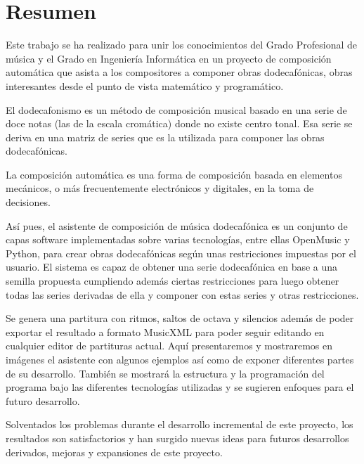 \documentclass[a4paper,openany,oneside,12pt]{book}
\begin{document}
\chapter*{Resumen}

Este trabajo se ha realizado para unir los conocimientos del Grado Profesional de música y el Grado en Ingeniería Informática en un proyecto de composición automática que asista a los compositores a componer obras dodecafónicas, obras interesantes desde el punto de vista matemático y programático.

El dodecafonismo es un método de composición musical basado en una serie de doce notas (las de la escala cromática) donde no existe centro tonal. Esa serie se deriva en una matriz de series que es la utilizada para componer las obras dodecafónicas.

La composición automática es una forma de composición basada en elementos mecánicos, o más frecuentemente electrónicos y digitales, en la toma de decisiones.

Así pues, el asistente de composición de música dodecafónica es un conjunto de capas software implementadas sobre varias tecnologías, entre ellas OpenMusic y Python, para crear obras dodecafónicas según unas restricciones impuestas por el usuario. El sistema es capaz de obtener una serie dodecafónica en base a una semilla propuesta cumpliendo además ciertas restricciones para luego obtener todas las series derivadas de ella y componer con estas series y otras restricciones.

Se genera una partitura con ritmos, saltos de octava y silencios además de poder exportar el resultado a formato MusicXML para poder seguir editando en cualquier editor de partituras actual. Aquí presentaremos y mostraremos en imágenes el asistente con algunos ejemplos así como de exponer diferentes partes de su desarrollo. También se mostrará la estructura y la programación del programa bajo las diferentes tecnologías utilizadas y se sugieren enfoques para el futuro desarrollo.

Solventados los problemas durante el desarrollo incremental de este proyecto, los resultados son satisfactorios y han surgido nuevas ideas para futuros desarrollos derivados, mejoras y expansiones de este proyecto.
\end{document}
